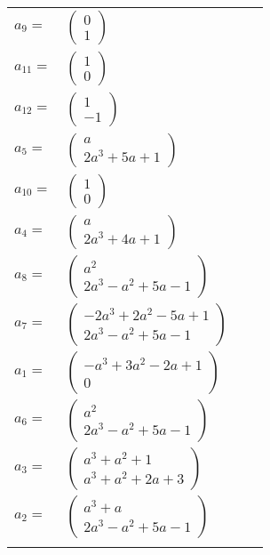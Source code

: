 \documentclass[1p]{elsarticle_modified}
\theoremstyle{definition}
\begin{document}
\begin{tabular}{m{7pt} m{180pt} m{7pt} m{180pt} }
\flushright $a_{9}=$&$\begin{pmatrix}0\\1\end{pmatrix}$ \\
\flushright $a_{11}=$&$\begin{pmatrix}1\\0\end{pmatrix}$ \\
\flushright $a_{12}=$&$\begin{pmatrix}1\\-1\end{pmatrix}$ \\
\flushright $a_{5}=$&$\begin{pmatrix}a\\2 a^3+5 a+1\end{pmatrix}$ \\
\flushright $a_{10}=$&$\begin{pmatrix}1\\0\end{pmatrix}$ \\
\flushright $a_{4}=$&$\begin{pmatrix}a\\2 a^3+4 a+1\end{pmatrix}$ \\
\flushright $a_{8}=$&$\begin{pmatrix}a^2\\2 a^3- a^2+5 a-1\end{pmatrix}$ \\
\flushright $a_{7}=$&$\begin{pmatrix}-2 a^3+2 a^2-5 a+1\\2 a^3- a^2+5 a-1\end{pmatrix}$ \\
\flushright $a_{1}=$&$\begin{pmatrix}- a^3+3 a^2-2 a+1\\0\end{pmatrix}$ \\
\flushright $a_{6}=$&$\begin{pmatrix}a^2\\2 a^3- a^2+5 a-1\end{pmatrix}$ \\
\flushright $a_{3}=$&$\begin{pmatrix}a^3+a^2+1\\a^3+a^2+2 a+3\end{pmatrix}$ \\
\flushright $a_{2}=$&$\begin{pmatrix}a^3+a\\2 a^3- a^2+5 a-1\end{pmatrix}$\\&\end{tabular}
\end{document}
